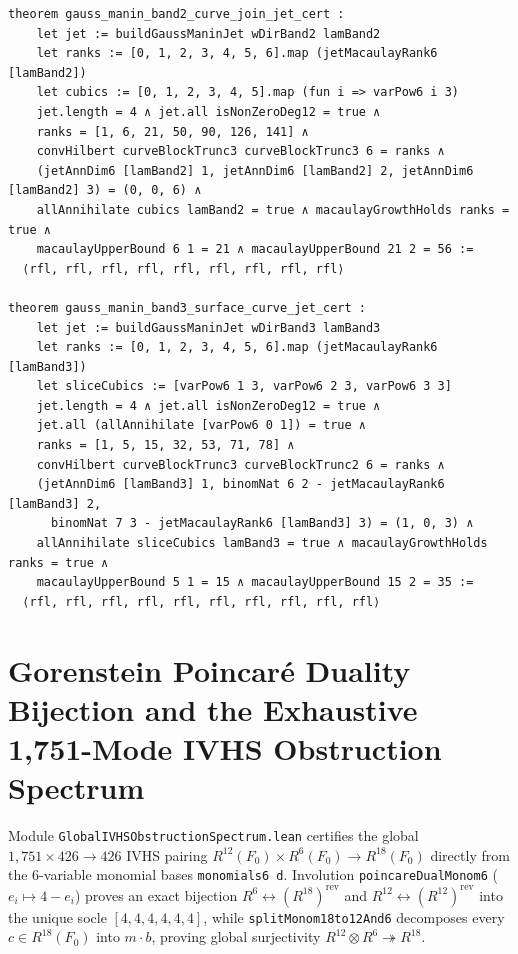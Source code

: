 \documentclass[11pt,a4paper]{article}
\begin{document}
\begin{lstlisting}[caption={3-band Gauss--Manin jet transport and Gotzmann persistence in \texttt{GaussManinJetTransport.lean}.}]
theorem gauss_manin_band2_curve_join_jet_cert :
    let jet := buildGaussManinJet wDirBand2 lamBand2
    let ranks := [0, 1, 2, 3, 4, 5, 6].map (jetMacaulayRank6 [lamBand2])
    let cubics := [0, 1, 2, 3, 4, 5].map (fun i => varPow6 i 3)
    jet.length = 4 ∧ jet.all isNonZeroDeg12 = true ∧
    ranks = [1, 6, 21, 50, 90, 126, 141] ∧
    convHilbert curveBlockTrunc3 curveBlockTrunc3 6 = ranks ∧
    (jetAnnDim6 [lamBand2] 1, jetAnnDim6 [lamBand2] 2, jetAnnDim6 [lamBand2] 3) = (0, 0, 6) ∧
    allAnnihilate cubics lamBand2 = true ∧ macaulayGrowthHolds ranks = true ∧
    macaulayUpperBound 6 1 = 21 ∧ macaulayUpperBound 21 2 = 56 :=
  ⟨rfl, rfl, rfl, rfl, rfl, rfl, rfl, rfl, rfl⟩

theorem gauss_manin_band3_surface_curve_jet_cert :
    let jet := buildGaussManinJet wDirBand3 lamBand3
    let ranks := [0, 1, 2, 3, 4, 5, 6].map (jetMacaulayRank6 [lamBand3])
    let sliceCubics := [varPow6 1 3, varPow6 2 3, varPow6 3 3]
    jet.length = 4 ∧ jet.all isNonZeroDeg12 = true ∧
    jet.all (allAnnihilate [varPow6 0 1]) = true ∧
    ranks = [1, 5, 15, 32, 53, 71, 78] ∧
    convHilbert curveBlockTrunc3 curveBlockTrunc2 6 = ranks ∧
    (jetAnnDim6 [lamBand3] 1, binomNat 6 2 - jetMacaulayRank6 [lamBand3] 2,
      binomNat 7 3 - jetMacaulayRank6 [lamBand3] 3) = (1, 0, 3) ∧
    allAnnihilate sliceCubics lamBand3 = true ∧ macaulayGrowthHolds ranks = true ∧
    macaulayUpperBound 5 1 = 15 ∧ macaulayUpperBound 15 2 = 35 :=
  ⟨rfl, rfl, rfl, rfl, rfl, rfl, rfl, rfl, rfl, rfl⟩
\end{lstlisting}

\section{Gorenstein Poincar\'e Duality Bijection and the Exhaustive 1,751-Mode IVHS Obstruction Spectrum}

Module \texttt{GlobalIVHSObstructionSpectrum.lean} certifies the global $1{,}751 \times 426 \to 426$ IVHS pairing $R^{12}(F_0) \times R^6(F_0) \to R^{18}(F_0)$ directly from the $6$-variable monomial bases \texttt{monomials6 d}. Involution \texttt{poincareDualMonom6} ($e_i \mapsto 4 - e_i$) proves an exact bijection $R^6 \leftrightarrow (R^{18})^{\mathrm{rev}}$ and $R^{12} \leftrightarrow (R^{12})^{\mathrm{rev}}$ into the unique socle $[4,4,4,4,4,4]$, while \texttt{splitMonom18to12And6} decomposes every $c \in R^{18}(F_0)$ into $m \cdot b$, proving global surjectivity $R^{12} \otimes R^6 \twoheadrightarrow R^{18}$.
\end{document}
